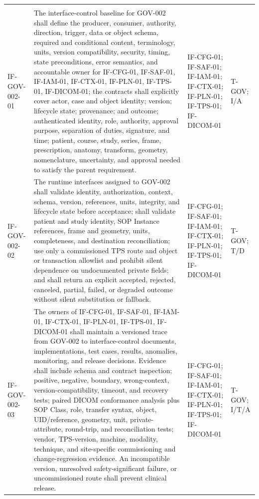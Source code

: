 \documentclass[11pt,letterpaper]{article}
\begin{document}
\begin{scriptsize}
\begin{longtable}{@{}L{0.14\textwidth}L{0.49\textwidth}L{0.19\textwidth}L{0.10\textwidth}@{}}
\addlinespace[2pt]
 \\
\addlinespace[2pt]
\mbox{IF-GOV-002-01} & The interface-control baseline for GOV-002 shall define the producer, consumer, authority, direction, trigger, data or object schema, required and conditional content, terminology, units, version compatibility, security, timing, state preconditions, error semantics, and accountable owner for IF-CFG-01, IF-SAF-01, IF-IAM-01, IF-CTX-01, IF-PLN-01, IF-TPS-01, IF-DICOM-01; the contracts shall explicitly cover actor, case and object identity; version; lifecycle state; provenance; and outcome; authenticated identity, role, authority, approval purpose, separation of duties, signature, and time; patient, course, study, series, frame, prescription, anatomy, transform, geometry, nomenclature, uncertainty, and approval needed to satisfy the parent requirement. & IF-CFG-01; IF-SAF-01; IF-IAM-01; IF-CTX-01; IF-PLN-01; IF-TPS-01; IF-DICOM-01 & T-GOV; I\slash\allowbreak{}A \\
\addlinespace[2pt]
\mbox{IF-GOV-002-02} & The runtime interfaces assigned to GOV-002 shall validate identity, authorization, context, schema, version, references, units, integrity, and lifecycle state before acceptance; shall validate patient and study identity, SOP Instance references, frame and geometry, units, completeness, and destination reconciliation; use only a commissioned TPS route and object or transaction allowlist and prohibit silent dependence on undocumented private fields; and shall return an explicit accepted, rejected, canceled, partial, failed, or degraded outcome without silent substitution or fallback. & IF-CFG-01; IF-SAF-01; IF-IAM-01; IF-CTX-01; IF-PLN-01; IF-TPS-01; IF-DICOM-01 & T-GOV; T\slash\allowbreak{}D \\
\addlinespace[2pt]
\mbox{IF-GOV-002-03} & The owners of IF-CFG-01, IF-SAF-01, IF-IAM-01, IF-CTX-01, IF-PLN-01, IF-TPS-01, IF-DICOM-01 shall maintain a versioned trace from GOV-002 to interface-control documents, implementations, test cases, results, anomalies, monitoring, and release decisions. Evidence shall include schema and contract inspection; positive, negative, boundary, wrong-context, version-compatibility, timeout, and recovery tests; paired DICOM conformance analysis plus SOP Class, role, transfer syntax, object, UID\slash\allowbreak{}reference, geometry, unit, private-attribute, round-trip, and reconciliation tests; vendor, TPS-version, machine, modality, technique, and site-specific commissioning and change-regression evidence. An incompatible version, unresolved safety-significant failure, or uncommissioned route shall prevent clinical release. & IF-CFG-01; IF-SAF-01; IF-IAM-01; IF-CTX-01; IF-PLN-01; IF-TPS-01; IF-DICOM-01 & T-GOV; I\slash\allowbreak{}T\slash\allowbreak{}A \\

\end{longtable}
\end{scriptsize}
\end{document}
